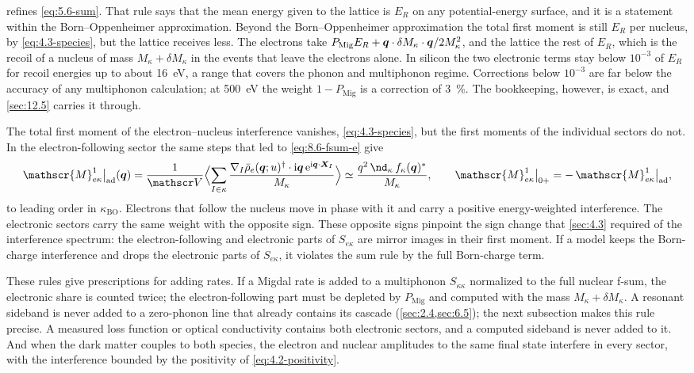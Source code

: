  refines \cref{eq:5.6-sum}. That rule says that the mean energy given to the lattice is $E_R$ on any potential-energy surface, and it is a statement within the Born--Oppenheimer approximation. Beyond the Born--Oppenheimer approximation the total first moment is still $E_R$ per nucleus, by \cref{eq:4.3-species}, but the lattice receives less. The electrons take $P_{\mathrm{Mig}}E_R + \bm{q}\cdot\delta M_\kappa\cdot\bm{q}/2M_\kappa^2$, and the lattice the rest of $E_R$, which is the recoil of a nucleus of mass $M_\kappa + \delta M_\kappa$ in the events that leave the electrons alone. In silicon the two electronic terms stay below $10^{-3}$ of $E_R$ for recoil energies up to about \SI{16}{eV}, a range that covers the phonon and multiphonon regime. Corrections below $10^{-3}$ are far below the accuracy of any multiphonon calculation; at \SI{500}{eV} the weight $1 - P_{\mathrm{Mig}}$ is a correction of \SI{3}{\percent}. The bookkeeping, however, is exact, and \cref{sec:12.5} carries it through.

The total first moment of the electron--nucleus interference vanishes, \cref{eq:4.3-species}, but the first moments of the individual sectors do not. In the electron-following sector the same steps that led to \cref{eq:8.6-fsum-e} give
\begin{equation}
  \mathscr{M}^1_{e\kappa}\big|_{\mathrm{ad}}(\vect{q}) = \frac{1}{\Vol}\Bigl\langle\sum_{I\in\kappa}\frac{\nabla_I\bar\rho_e(\vect{q};u)^\dagger\cdot\ii\vect{q}\,\ee^{\ii\vect{q}\cdot\vect{X}_I}}{M_\kappa}\Bigr\rangle \simeq \frac{q^2\,\nd_\kappa\,f_\kappa(\vect{q})^*}{M_\kappa} , \qquad
  \mathscr{M}^1_{e\kappa}\big|_{0+} = -\,\mathscr{M}^1_{e\kappa}\big|_{\mathrm{ad}} ,
  \label{eq:8.6-fsum-ek}
\end{equation}
to leading order in $\kappa_{\mathrm{BO}}$. Electrons that follow the nucleus move in phase with it and carry a positive energy-weighted interference. The electronic sectors carry the same weight with the opposite sign. These opposite signs pinpoint the sign change that \cref{sec:4.3} required of the interference spectrum: the electron-following and electronic parts of $S_{e\kappa}$ are mirror images in their first moment. If a model keeps the Born-charge interference and drops the electronic parts of $S_{e\kappa}$, it violates the sum rule by the full Born-charge term.

These rules give prescriptions for adding rates. If a Migdal rate is added to a multiphonon $S_{\kappa\kappa}$ normalized to the full nuclear f-sum, the electronic share is counted twice; the electron-following part must be depleted by $P_{\mathrm{Mig}}$ and computed with the mass $M_\kappa + \delta M_\kappa$. A resonant sideband is never added to a zero-phonon line that already contains its cascade (\cref{sec:2.4,sec:6.5}); the next subsection makes this rule precise. A measured loss function or optical conductivity contains both electronic sectors, and a computed sideband is never added to it. And when the dark matter couples to both species, the electron and nuclear amplitudes to the same final state interfere in every sector, with the interference bounded by the positivity of \cref{eq:4.2-positivity}.


